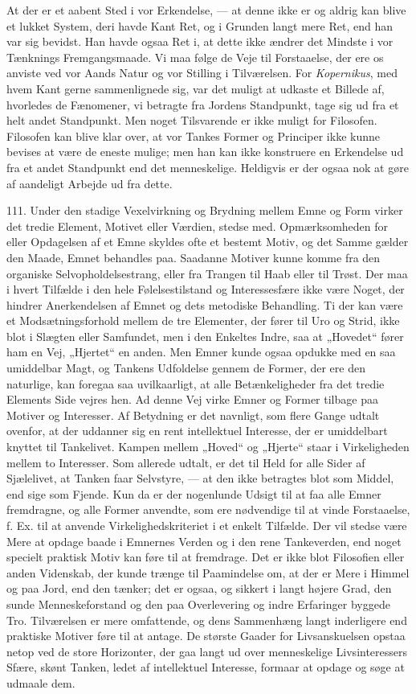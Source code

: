 \documentclass[12pt,a4paper]{book}
\newcommand{\apage}[1]{\marginnote{\footnotesize\textit{[#1]}}}
\begin{document}
At der er et aabent Sted i vor Erkendelse, --- at denne ikke er og aldrig kan blive
et lukket System, deri havde Kant Ret, og i Grunden langt mere Ret, end han var sig
bevidst. Han havde ogsaa Ret i, at dette ikke ændrer det Mindste i vor Tænknings
Fremgangsmaade. Vi maa følge de Veje til \apage{264} Forstaaelse, der ere os anviste ved vor
Aands Natur og vor Stilling i Tilværelsen. For \emph{Kopernikus}, med hvem Kant
gerne sammenlignede sig, var det muligt at udkaste et Billede af, hvorledes de
Fænomener, vi betragte fra Jordens Standpunkt, tage sig ud fra et helt andet
Standpunkt. Men noget Tilsvarende er ikke muligt for Filosofen. Filosofen kan blive
klar over, at vor Tankes Former og Principer ikke kunne bevises at være de eneste
mulige; men han kan ikke konstruere en Erkendelse ud fra et andet Standpunkt end
det menneskelige. Heldigvis er der ogsaa nok at gøre af aandeligt Arbejde ud fra
dette.

111. Under den stadige Vexelvirkning og Brydning mellem Emne og Form virker det
tredie Element, Motivet eller Værdien, stedse med. Opmærksomheden for eller
Opdagelsen af et Emne skyldes ofte et bestemt Motiv, og det Samme gælder den Maade,
Emnet behandles paa. Saadanne Motiver kunne komme fra den organiske
Selvopholdelsestrang, eller fra Trangen til Haab eller til Trøst. Der maa i hvert
Tilfælde i den hele Følelsestilstand og Interessesfære ikke være Noget, der hindrer
Anerkendelsen af Emnet og dets metodiske Behandling. Ti der kan være et
Modsætningsforhold mellem de tre Elementer, der fører til Uro og Strid, ikke blot i
Slægten eller Samfundet, men i den Enkeltes Indre, saa at „Hovedet“ fører ham en
Vej, „Hjertet“ en anden. Men Emner kunde ogsaa opdukke med en saa umiddelbar Magt,
og Tankens Udfoldelse gennem de Former, der ere den naturlige, kan foregaa saa
uvilkaarligt, at alle Betænkeligheder fra det tredie Elements Side vejres hen. Ad
denne Vej virke Emner og Former tilbage paa Motiver og Interesser. Af Betydning er
det navnligt, som flere Gange udtalt ovenfor, at der uddanner sig en rent
intellektuel Interesse, der er umiddelbart knyttet til Tankelivet. Kampen mellem
„Hoved“ og „Hjerte“ staar i Virkeligheden mellem to Interesser. Som allerede
udtalt, er det til Held for alle Sider af Sjælelivet, at Tanken faar Selvstyre, ---
at den ikke betragtes blot som Middel, end sige som Fjende. Kun da er der
nogenlunde Udsigt til at faa alle Emner fremdragne, og alle Former anvendte, som
ere nødvendige \apage{265} til at vinde Forstaaelse, f. Ex. til at anvende Virkelighedskriteriet
i et enkelt Tilfælde. Der vil stedse være Mere at opdage baade i Emnernes Verden og
i den rene Tankeverden, end noget specielt praktisk Motiv kan føre til at
fremdrage. Det er ikke blot Filosofien eller anden Videnskab, der kunde trænge til
Paamindelse om, at der er Mere i Himmel og paa Jord, end den tænker; det er ogsaa,
og sikkert i langt højere Grad, den sunde Menneskeforstand og den paa Overlevering
og indre Erfaringer byggede Tro. Tilværelsen er mere omfattende, og dens
Sammenhæng langt inderligere end praktiske Motiver føre til at antage. De største
Gaader for Livsanskuelsen opstaa netop ved de store Horizonter, der gaa langt ud
over menneskelige Livsinteressers Sfære, skønt Tanken, ledet af intellektuel
Interesse, formaar at opdage og søge at udmaale dem.
\end{document}
